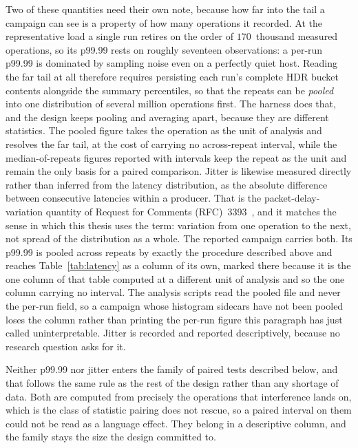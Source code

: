 \documentclass[english,oneside,a4paper,censored,csm,software-track-2020]{HYthesisML}
\begin{document}
Two of these quantities need their own note, because how far into the tail a campaign can see
is a property of how many operations it recorded. At the representative load a single run
retires on the order of $170$~thousand measured operations, so its p99.99 rests on roughly
seventeen observations: a per-run p99.99 is dominated by sampling noise even on a perfectly
quiet host. Reading the far tail at all therefore requires persisting each run's complete HDR
bucket contents alongside the summary percentiles, so that the repeats can be \emph{pooled} into
one distribution of several million operations first. The harness does that, and the design keeps
pooling and averaging apart, because they are different statistics. The pooled figure takes the
operation as the unit of analysis and resolves the far tail, at the cost of carrying no
across-repeat interval, while the median-of-repeats figures reported with intervals keep the
repeat as the unit and remain the only basis for a paired comparison. Jitter is likewise
measured directly rather than inferred from the latency distribution, as the absolute difference
between consecutive latencies within a producer. That is the packet-delay-variation quantity of
Request for Comments (RFC)~3393~\cite{rfc3393}, and it matches the sense in which this thesis
uses the term: variation
from one operation to the next, not spread of the distribution as a whole. The reported campaign
carries both. Its p99.99 is pooled across repeats by exactly the procedure described above and
reaches Table~\ref{tab:latency} as a column of its own, marked there because it is the one column of
that table computed at a different unit of analysis and so the one column carrying no interval. The
analysis scripts read the pooled file and never the per-run field, so a campaign whose histogram
sidecars have not been pooled loses the column rather than printing the per-run figure this paragraph
has just called uninterpretable. Jitter is recorded and reported descriptively, because no research
question asks for it.

Neither p99.99 nor jitter enters the family of paired tests described below, and that follows the
same rule as the rest of the design rather than any shortage of data. Both are computed from
precisely the operations that interference lands on, which is the class of statistic pairing does
not rescue, so a paired interval on them could not be read as a language effect. They belong in a
descriptive column, and the family stays the size the design committed to.
\end{document}
